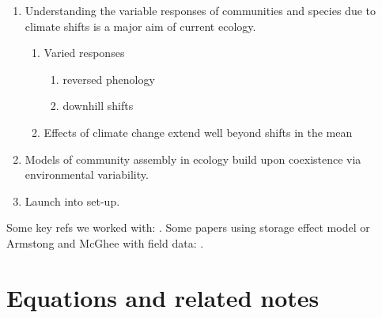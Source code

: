 \documentclass[11pt,a4paper,oneside]{article}
\begin{document}
\begin{enumerate}
\item Understanding the variable responses of communities and species
  due to climate shifts is a major aim of current
ecology.
\begin{enumerate}
\item Varied responses
\begin{enumerate}
\item reversed phenology \citep{yu2010} 
\item downhill shifts \citep{Crimmins:2011dq}
\end{enumerate}
\item Effects of climate change extend well beyond shifts in the mean
\end{enumerate}
\item Models of community assembly in ecology build upon coexistence
  via environmental variability.
\item Launch into set-up.
\end{enumerate}
\noindent Some key refs we worked with:
\citep{Chesson:1993gi,Chesson:2000ak,Chesson:2000vd,Chesson:2004eo}. Some
papers using storage effect model or Armstong and McGhee with field
data: \citep{Angert:2009ng,Kuang:2008ri,Kuang:2009rj,Levine:2009ym}.\\

\newpage
\section{Equations and related notes}
\end{document}

